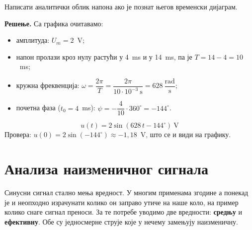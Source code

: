 \documentclass{article}
\begin{document}
\begin{primer}
Написати аналитички облик напона ако је познат његов временски дијаграм.
\begin{center}
\end{center}

\textbf{Решење.} Са графика очитавамо:
\begin{itemize}
    \item амплитуда: $U_m = 2$~V;
    \item напон пролази кроз нулу растући у 4~ms и у 14~ms, па је $T = 14 - 4 = 10$~ms;
    \item кружна фреквенција: $\omega = \dfrac{2\pi}{T} = \dfrac{2\pi}{10\cdot 10^{-3}~\mathrm{s}} = 628~\dfrac{\mathrm{rad}}{\mathrm{s}}$;
    \item почетна фаза ($t_0 = 4$~ms): $\psi = -\dfrac{4}{10}\cdot 360^\circ = -144^\circ$.
\end{itemize}
\[
    u(t) = 2\sin(628\,t - 144^\circ)~\mathrm{V}
\]
Провера: $u(0) = 2\sin(-144^\circ) \approx -1{,}18$~V, што се и види на графику.
\end{primer}


\section{Анализа наизменичног сигнала}

Синусни сигнал стално мења вредност. У многим применама згодине а понекад је и неопходно израчунати колико он заправо утиче на наше коло, на пример колико снаге сигнал преноси. За те потребе уводимо две вредности: \textbf{средњу} и \textbf{ефективну}. Обе су једносмерне струје које у нечему замењују наизменичну.
\end{document}
